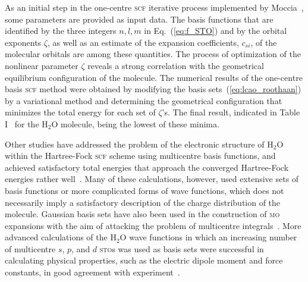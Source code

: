  
As an initial step in the one-centre \textsc{scf} iterative process
implemented by
Moccia~\cite{Moccia_JCP_2164,Moccia_JCP_2176,Moccia_1964}, some
parameters are provided as input data. The basis functions that are
identified by the three integers $n,l,m$ in Eq.~(\ref{eq:f_STO}) and
by the orbital exponents $\zeta$, as well as an estimate of the
expansion coefficients, $c_{si}$, of the molecular orbitals are among
these quantities. The process of optimization of the nonlinear
parameter $\zeta$ reveals a strong correlation with the geometrical
equilibrium configuration of the molecule. The numerical results of
the one-centre basis \textsc{scf} method were obtained by modifying
the basis sets~(\ref{eq:lcao_roothaan}) by a variational method and
determining the geometrical configuration that minimizes the total
energy for each set of $\zeta$'s. The final result, indicated in Table
I~\cite{Moccia_1964} for the H$_{2}$O molecule, being the lowest of
these minima.







Other studies have addressed the problem of the electronic structure
of H$_{2}$O within the Hartree-Fock \textsc{scf} scheme using
multicentre basis functions, and achieved satisfactory total energies
that approach the converged Hartree-Fock energies rather
well~\cite{natureH2O_1960, gaussianH2O_1965,
  Moccia_oneCenterHF_1967,Reeves_nature_1956}. Many of these
calculations, however, used extensive sets of basis functions or more
complicated forms of wave functions, which does not necessarily imply
a satisfactory description of the charge distribution of the
molecule. Gaussian basis sets have also been used in the construction
of \textsc{mo} expansions with the aim of attacking the problem of
multicentre
integrals~\cite{gaussianH2O_1965,Neumann_gaussian_1968}. More advanced
calculations of the H$_{2}$O wave functions in which an increasing
number of multicentre $s$, $p$, and $d$ \textsc{sto}s was used as
basis sets were successful in calculating physical properties, such as
the electric dipole moment and force constants, in good agreement with
experiment~\cite{Pitzer_1968,Pitzer_1970}.











